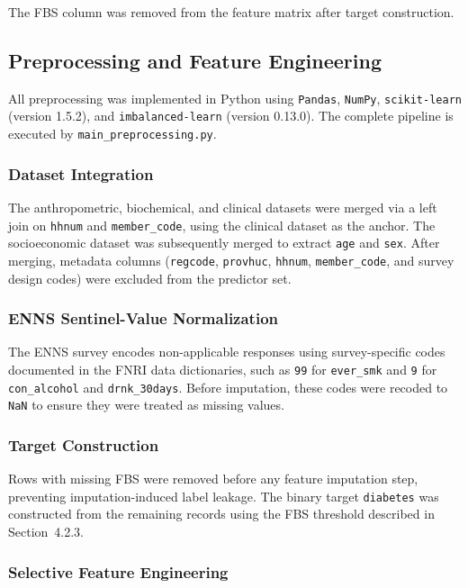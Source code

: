 The FBS column was removed from the feature matrix after target construction.

\subsection{Preprocessing and Feature Engineering}

All preprocessing was implemented in Python using \texttt{Pandas}, \texttt{NumPy}, \texttt{scikit-learn} (version 1.5.2), and \texttt{imbalanced-learn} (version 0.13.0). The complete pipeline is executed by \texttt{main\_preprocessing.py}.

\subsubsection{Dataset Integration}

The anthropometric, biochemical, and clinical datasets were merged via a left join on \texttt{hhnum} and \texttt{member\_code}, using the clinical dataset as the anchor. The socioeconomic dataset was subsequently merged to extract \texttt{age} and \texttt{sex}. After merging, metadata columns (\texttt{regcode}, \texttt{provhuc}, \texttt{hhnum}, \texttt{member\_code}, and survey design codes) were excluded from the predictor set.

\subsubsection{ENNS Sentinel-Value Normalization}

The ENNS survey encodes non-applicable responses using survey-specific codes documented in the FNRI data dictionaries, such as \texttt{99} for \texttt{ever\_smk} and \texttt{9} for \texttt{con\_alcohol} and \texttt{drnk\_30days}. Before imputation, these codes were recoded to \texttt{NaN} to ensure they were treated as missing values.

\subsubsection{Target Construction}

Rows with missing FBS were removed before any feature imputation step, preventing imputation-induced label leakage. The binary target \texttt{diabetes} was constructed from the remaining records using the FBS threshold described in Section~4.2.3.

\subsubsection{Selective Feature Engineering}

